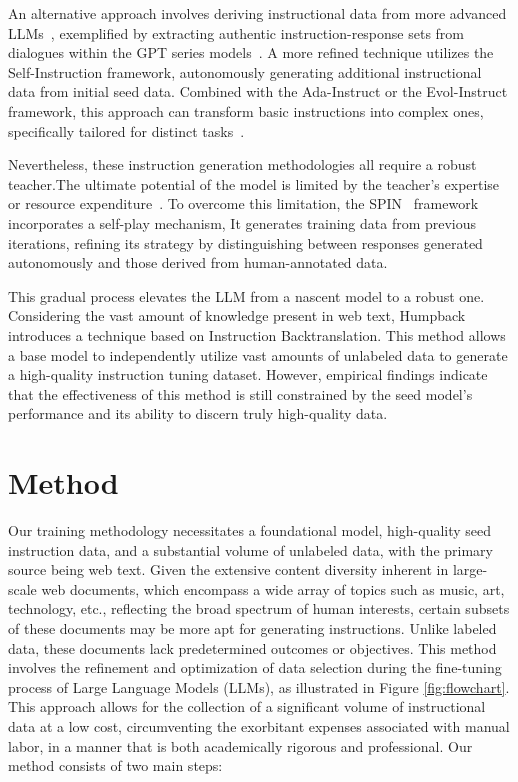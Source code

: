 An alternative approach involves deriving instructional data from more advanced LLMs~\citep{alpaca}, exemplified by extracting authentic instruction-response sets from dialogues within the GPT series models~\citep{selfinstruct}.
A more refined technique utilizes the Self-Instruction framework, autonomously generating additional instructional data from initial seed data. Combined with the Ada-Instruct or the Evol-Instruct framework, this approach can transform basic instructions into complex ones, specifically tailored for distinct tasks~\citep{cui2023ada,luo2023wizardcoder}.

Nevertheless, these instruction generation methodologies all require a robust teacher.The ultimate potential of the model is limited by the teacher's expertise or resource expenditure~\citep{li2023self}. 
To overcome this limitation, the SPIN~\citep{chen2024self} framework incorporates a self-play mechanism, It generates training data from previous iterations, refining its strategy by distinguishing between responses generated autonomously and those derived from human-annotated data. 

This gradual process elevates the LLM from a nascent model to a robust one. Considering the vast amount of knowledge present in web text, Humpback~\cite{li2023self} introduces a technique based on Instruction Backtranslation. 
This method allows a base model to independently utilize vast amounts of unlabeled data to generate a high-quality instruction tuning dataset. 
However, empirical findings indicate that the effectiveness of this method is still constrained by the seed model's performance and its ability to discern truly high-quality data.

\section{Method}

Our training methodology necessitates a foundational model, high-quality seed instruction data, and a substantial volume of unlabeled data, with the primary source being web text. Given the extensive content diversity inherent in large-scale web documents, which encompass a wide array of topics such as music, art, technology, etc., reflecting the broad spectrum of human interests, certain subsets of these documents may be more apt for generating instructions. Unlike labeled data, these documents lack predetermined outcomes or objectives.  This method involves the refinement and optimization of data selection during the fine-tuning process of Large Language Models (LLMs), as illustrated in Figure \ref{fig:flowchart}. This approach allows for the collection of a significant volume of instructional data at a low cost, circumventing the exorbitant expenses associated with manual labor, in a manner that is both academically rigorous and professional.
Our method consists of two main steps:

